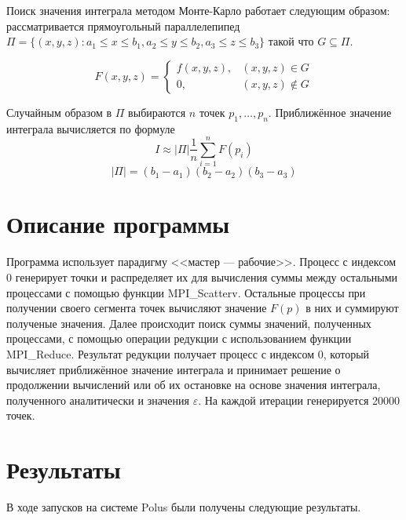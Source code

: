 \documentclass[12pt]{article}
\begin{document}
Поиск значения интеграла методом Монте-Карло работает следующим образом:
рассматривается прямоугольный параллелепипед
$\Pi = \{(x, y, z) :
a_1 \leqslant x \leqslant b_1,
a_2 \leqslant y \leqslant b_2,
a_3 \leqslant z \leqslant b_3\}$ такой что
$G \subseteq \Pi$.

$$
F(x, y, z) = \begin{cases}
	f(x, y, z),& (x, y, z) \in G \\
	0,& (x, y, z) \notin G \end{cases}
$$

Случайным образом в $\Pi$ выбираются $n$ точек $p_1, \ldots, p_n$.
Приближённое значение интеграла вычисляется по формуле
$$
I \approx |\Pi|\frac{1}{n}\sum_{i=1}^n F(p_i)
$$
$$
|\Pi| = (b_1 - a_1)(b_2 - a_2)(b_3 - a_3)
$$

\section{Описание программы}

Программа использует парадигму <<мастер --- рабочие>>.
Процесс с индексом 0 генерирует точки и распределяет их для вычисления суммы
между остальными процессами с помощью функции MPI\_Scatterv.
Остальные процессы при получении своего сегмента
точек вычисляют значение $F(p)$ в них и суммируют полученые значения.
Далее происходит поиск суммы значений, полученных процессами,
с помощью операции редукции с использованием функции MPI\_Reduce.
Результат редукции получает процесс с индексом 0, который вычисляет
приближённое значение интеграла и принимает решение о продолжении вычислений
или об их остановке на основе значения интеграла, полученного аналитически и
значения $\varepsilon$. На каждой итерации генерируется 20000 точек.

\section{Результаты}

В ходе запусков на системе Polus были получены следующие результаты.
\end{document}
